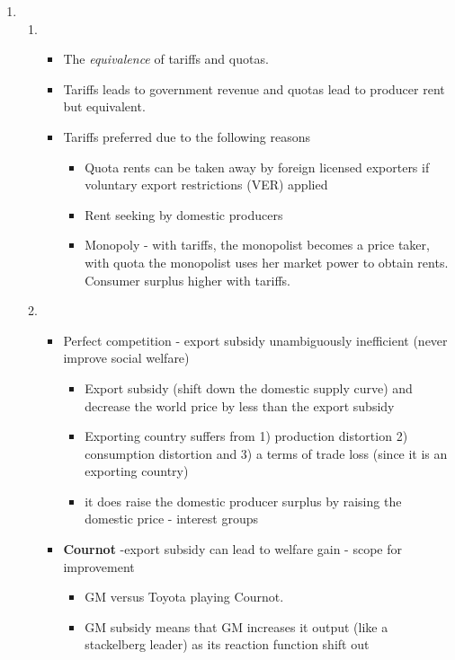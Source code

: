 \begin{enumerate}
	\renewcommand{\labelenumi}{Q\,\arabic{enumi}.}
	\renewcommand{\labelenumii}{(\alph{enumii})}
	\item 
	\begin{enumerate}
		\item {} 
		\begin{itemize}
			\item The \emph{equivalence} of tariffs and quotas. 
			\item Tariffs leads to government revenue and quotas lead to producer rent but equivalent.
			\item Tariffs preferred due to the following reasons
			\begin{itemize}
				\item Quota rents can be taken away by foreign licensed exporters if voluntary export restrictions (VER) applied
				\item Rent seeking by domestic producers
				\item Monopoly - with tariffs, the monopolist becomes a price taker, with quota the monopolist uses her market power to obtain rents. Consumer surplus higher with tariffs. 
			\end{itemize}
		\end{itemize} 
		\item {}
		\begin{itemize}
			\item Perfect competition - export subsidy unambiguously inefficient (never improve social welfare)
			\begin{itemize}
				\item Export subsidy (shift down the domestic supply curve) and decrease the world price by less than the export subsidy
				\item Exporting country suffers from 1) production distortion 2) consumption distortion and 3) a terms of trade loss (since it is an exporting country)
				\item it does raise the domestic producer surplus by raising the domestic price - interest groups
			\end{itemize}
			\item \textbf{Cournot} -export subsidy can lead to welfare gain - scope for improvement
			\begin{itemize}
				\item GM versus Toyota playing Cournot.
				\item GM subsidy means that GM increases it output (like a stackelberg leader) as its reaction function shift out 

\end{itemize}
\end{itemize}
\end{enumerate}
\end{enumerate}
